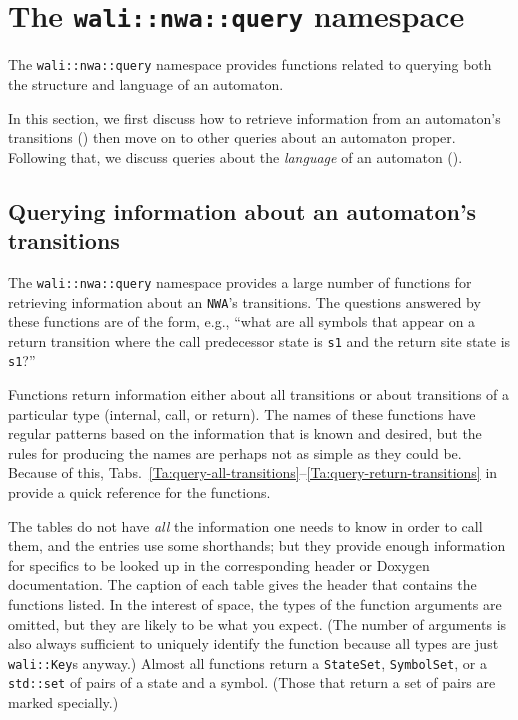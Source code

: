 \section{The \texttt{wali::nwa::query} namespace}
\label{Se:namespace-query}

The \texttt{wali::nwa::query} namespace provides functions related to
querying both the structure and language of an automaton.

In this section, we first discuss how to retrieve information from an
automaton's transitions () then move on to other
queries about an automaton proper.
Following that, we discuss queries about the
\textsl{language} of an automaton ().


\subsection{Querying information about an automaton's transitions}
\label{Se:query-transitions}
The \texttt{wali::nwa::query} namespace provides a large number of functions
for retrieving information about an \texttt{NWA}'s transitions. The questions
answered by these functions are of the form, e.g., ``what are all symbols that
appear on a return transition where the call predecessor state is \texttt{s1}
and the return site state is \texttt{s1}?''

Functions return information either about all transitions or about
transitions of a particular type (internal, call, or return). The names of
these functions have regular patterns based on the information that is
known and desired, but the rules for producing the names are perhaps not as
simple as they could be. Because of this,
Tabs.~\ref{Ta:query-all-transitions}--\ref{Ta:query-return-transitions} in 
provide a quick reference for the functions.

The tables do not have \textsl{all} the information one needs to know in
order to call them, and the entries use some shorthands; but they provide enough
information for specifics to be
looked up in the corresponding header or Doxygen documentation. The caption of each table
gives the header that contains the functions listed. In the interest of
space, the types of the function arguments are omitted, but they are likely to
be what you expect. (The number of arguments is also always sufficient to
uniquely identify the function because all types are just \texttt{wali::Key}s
anyway.) Almost all functions return a \texttt{StateSet}, \texttt{SymbolSet},
or a \texttt{std::set} of pairs of a state and a symbol. (Those that return a
set of pairs are marked specially.)

